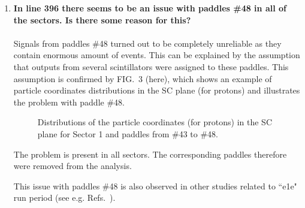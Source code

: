 \documentclass[,superscriptaddress,showpacs,amssymb,amsmath,amsfonts,linenumbers,article]{revtex4-1}
\begin{document}
\begin{enumerate}[label=\textbf{\arabic*}.]
\item {\bf In line 396 there seems to be an issue with paddles \#48 in all of the sectors. Is there some reason for this?}\\ \\
Signals from paddles \#48 turned out to be completely unreliable as they contain enormous amount of events. This can be explained by the assumption that outputs from several scintillators were assigned to these paddles. This assumption is confirmed by FIG.~3 (here), which shows an example of particle coordinates distributions in the SC plane (for protons) and illustrates the problem with paddle \#48.


\begin{figure}[htp]
\begin{center}
\caption{\small Distributions of the particle coordinates (for protons) in the SC plane for Sector 1 and paddles from \#43 to \#48.}  \label{fig:cc_plane_def}
\end{center}
\end{figure}


The problem is present in all sectors. The corresponding paddles therefore were removed from the analysis.

This issue with paddles \#48 is also observed in other studies related to ``e1e" run period (see e.g. Refs.~\cite{fedotov_prc,Ye_Tian:2017}).


\end{enumerate}
\end{document}
